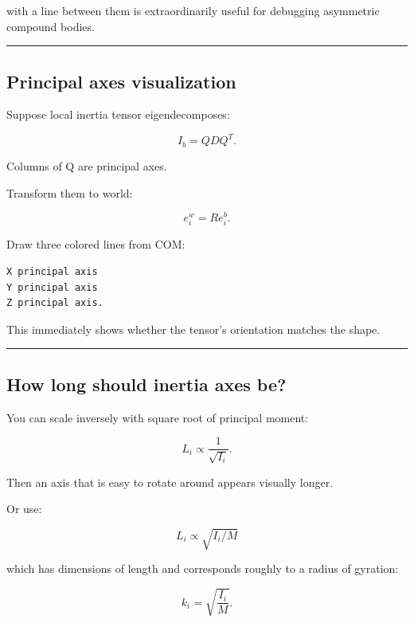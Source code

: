 with a line between them is extraordinarily useful for debugging asymmetric compound bodies.

\begin{center}\rule{0.5\linewidth}{0.5pt}\end{center}

\subsection{Principal axes visualization}\label{06-engine-ii-ch039-principal-axes-visualization}

\hypertarget{06-engine-ii-ch039-principal-axes-visualization}{}

Suppose local inertia tensor eigendecomposes:

\[
I_b=QDQ^T.
\]

Columns of Q are principal axes.

Transform them to world:

\[
e_i^w=R e_i^b.
\]

Draw three colored lines from COM:

\begin{verbatim}
X principal axis
Y principal axis
Z principal axis.
\end{verbatim}

This immediately shows whether the tensor's orientation matches the shape.

\begin{center}\rule{0.5\linewidth}{0.5pt}\end{center}

\subsection{How long should inertia axes be?}\label{06-engine-ii-ch039-how-long-should-inertia-axes-be}

\hypertarget{06-engine-ii-ch039-how-long-should-inertia-axes-be}{}

You can scale inversely with square root of principal moment:

\[
L_i
\propto
\frac1{\sqrt{I_i}}.
\]

Then an axis that is easy to rotate around appears visually longer.

Or use:

\[
L_i\propto\sqrt{I_i/M}
\]

which has dimensions of length and corresponds roughly to a radius of gyration:

\[
\boxed{
k_i
=
\sqrt{\frac{I_i}{M}}.
}
\]

